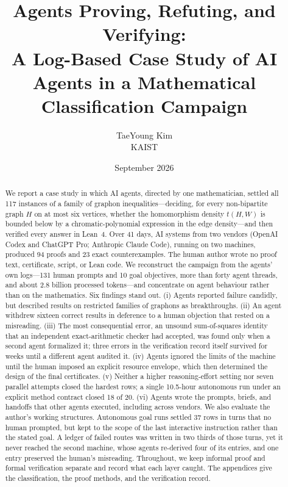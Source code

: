 \documentclass[11pt,a4paper]{article}
\title{Agents Proving, Refuting, and Verifying:\\
\large A Log-Based Case Study of AI Agents in a Mathematical Classification Campaign}
\author{TaeYoung Kim\\ \small KAIST}
\date{September 2026}
\begin{document}
\maketitle

\begin{abstract}
We report a case study in which AI agents, directed by one mathematician, settled all 117 instances of a
family of graphon inequalities---deciding, for every non-bipartite graph $H$ on at most six vertices, whether
the homomorphism density $t(H,W)$ is bounded below by a chromatic-polynomial expression in the edge
density---and then verified every answer in Lean~4. Over 41 days, AI systems from two vendors (OpenAI Codex
and ChatGPT Pro; Anthropic Claude Code), running on two machines, produced 94 proofs and 23 exact
counterexamples. The human author wrote no proof text, certificate, script, or Lean code. We reconstruct the
campaign from the agents' own logs---131 human prompts and 10 goal objectives, more than forty agent threads,
and about 2.8 billion processed tokens---and concentrate on agent behaviour rather than on the mathematics.
Six findings stand out. (i) Agents reported failure candidly, but described results on restricted families
of graphons as breakthroughs. (ii) An agent withdrew sixteen correct results in deference to a human
objection that rested on a misreading. (iii) The most consequential error, an unsound sum-of-squares identity
that an independent exact-arithmetic checker had accepted, was found only when a second agent formalized it;
three errors in the verification record itself survived for weeks until a different agent audited it.
(iv) Agents ignored the limits of the machine until the human imposed an explicit resource envelope, which
then determined the design of the final certificates. (v) Neither a higher reasoning-effort setting nor
seven parallel attempts closed the hardest rows; a single 10.5-hour autonomous run under an explicit method
contract closed 18 of 20. (vi) Agents wrote the prompts, briefs, and handoffs that other agents
executed, including across vendors. We also evaluate the author's working structures. Autonomous goal runs
settled 37 rows in turns that no human prompted, but kept to the scope of the last interactive instruction
rather than the stated goal. A ledger of failed routes was written in two thirds of those turns, yet it never
reached the second machine, whose agents re-derived four of its entries, and one entry preserved the human's
misreading. Throughout, we keep informal proof and formal verification separate and record what each layer
caught. The appendices give the classification, the proof methods, and the
verification record.
\end{abstract}
\end{document}
